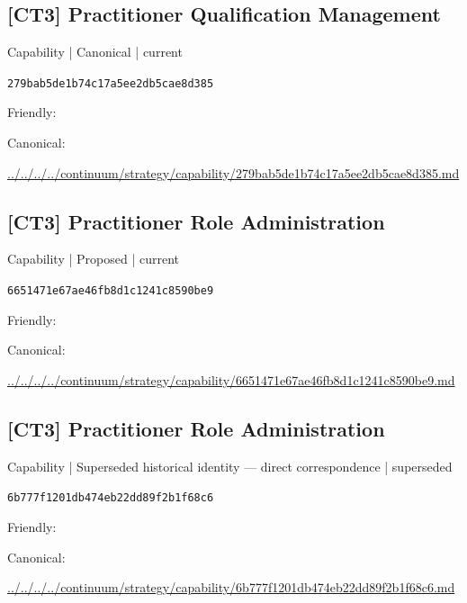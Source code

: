 \documentclass[10pt,a4paper]{article}
\begin{document}
\subsection*{[CT3] Practitioner Qualification Management}
{\small Capability | Canonical | current}\par
\texttt{279bab5de1b74c17a5ee2db5cae8d385}\par
Friendly: \par
Canonical: \par
{\footnotesize\url{../../../../continuum/strategy/capability/279bab5de1b74c17a5ee2db5cae8d385.md}}\par
\subsection*{[CT3] Practitioner Role Administration}
{\small Capability | Proposed | current}\par
\texttt{6651471e67ae46fb8d1c1241c8590be9}\par
Friendly: \par
Canonical: \par
{\footnotesize\url{../../../../continuum/strategy/capability/6651471e67ae46fb8d1c1241c8590be9.md}}\par
\subsection*{[CT3] Practitioner Role Administration}
{\small Capability | Superseded historical identity — direct correspondence | superseded}\par
\texttt{6b777f1201db474eb22dd89f2b1f68c6}\par
Friendly: \par
Canonical: \par
{\footnotesize\url{../../../../continuum/strategy/capability/6b777f1201db474eb22dd89f2b1f68c6.md}}\par
\end{document}
